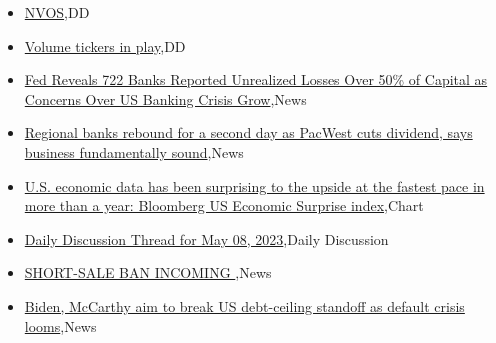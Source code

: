 \documentclass{article}%
\begin{document}
%
\begin{itemize}%
\item%
\href{https://reddit.com/r/wallstreetbets/comments/13bn9ze/nvos/}{NVOS},DD%
\item%
\href{https://reddit.com/r/wallstreetbets/comments/13bmncb/volume\_tickers\_in\_play/}{Volume tickers in play},DD%
\item%
\href{https://reddit.com/r/wallstreetbets/comments/13bmhgq/fed\_reveals\_722\_banks\_reported\_unrealized\_losses/}{Fed Reveals 722 Banks Reported Unrealized Losses Over 50\% of Capital as Concerns Over US Banking Crisis Grow},News%
\item%
\href{https://reddit.com/r/wallstreetbets/comments/13bmbo5/regional\_banks\_rebound\_for\_a\_second\_day\_as/}{Regional banks rebound for a second day as PacWest cuts dividend, says business fundamentally sound},News%
\item%
\href{https://reddit.com/r/wallstreetbets/comments/13bkoue/us\_economic\_data\_has\_been\_surprising\_to\_the/}{U.S. economic data has been surprising to the upside at the fastest pace in more than a year: Bloomberg US Economic Surprise index},Chart%
\item%
\href{https://reddit.com/r/wallstreetbets/comments/13bkdcr/daily\_discussion\_thread\_for\_may\_08\_2023/}{Daily Discussion Thread for May 08, 2023},Daily Discussion%
\item%
\href{https://reddit.com/r/StockMarket/comments/13azi4o/shortsale\_ban\_incoming/}{SHORT-SALE BAN INCOMING },News%
\item%
\href{https://reddit.com/r/Economics/comments/13bl4px/biden\_mccarthy\_aim\_to\_break\_us\_debtceiling/}{Biden, McCarthy aim to break US debt-ceiling standoff as default crisis looms},News%
\end{itemize}%
\end{document}
